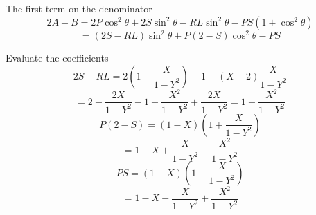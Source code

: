 The first term on the denominator
\begin{equation*}
	2A - B = 2P\cos^2 \theta + 2S \sin^2 \theta - RL \sin^2 \theta - PS \left( 1 + \cos^2 \theta \right)
\end{equation*}
\begin{equation}\label{ah_denominator}
	= \left( 2S - RL \right) \sin^2 \theta + P \left( 2 - S \right) \cos^2 \theta - PS
\end{equation}

Evaluate the coefficients
\begin{equation*}
	2S - RL = 2 \left(1 - \frac{X}{1 - Y^2}\right) - 1 - \left( X - 2 \right)\frac{X}{1 - Y^2}
\end{equation*}
\begin{equation}
	= 2 - \frac{2X}{1 - Y^2} - 1 - \frac{X^2}{1 - Y^2} + \frac{2X}{1 - Y^2} = 1 - \frac{X^2}{1 - Y^2}
\end{equation}
\begin{equation*}
	P \left( 2 - S \right) = \left( 1 - X \right)\left( 1 + \frac{X}{1 - Y^2} \right)
\end{equation*}
\begin{equation}
	= 1 - X + \frac{X}{1 - Y^2} - \frac{X^2}{1 - Y^2}
\end{equation}
\begin{equation*}
	PS = \left( 1 - X \right)\left( 1 - \frac{X}{1 - Y^2} \right)
\end{equation*}
\begin{equation}
	= 1 - X - \frac{X}{1 - Y^2} + \frac{X^2}{1 - Y^2}
\end{equation}

